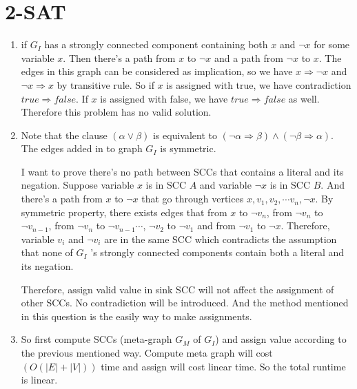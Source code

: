 \documentclass[11pt]{article}
\newenvironment{qparts}{\begin{enumerate}[{(}a{)}]}{\end{enumerate}}
\begin{document}
\section{2-SAT}
\begin{qparts}
	
	\item 

	if $G_I$ has a strongly connected component containing both $x$ and $\neg x$ for some variable $x$. Then there's a path from $x$ to $\neg x$ and a path from $\neg x$ to $x$. The edges in this graph can be considered as implication, so we have $x \Rightarrow  \neg x$ and $\neg x \Rightarrow  x$ by transitive rule.
	So if $x$ is assigned with true, we have contradiction $true\Rightarrow false$. If  $x$ is assigned with false, we have $true\Rightarrow false$ as well. Therefore this problem has no valid solution.
	
	\item
	
	Note that the clause $(\alpha \lor \beta)$ is equivalent to $(\neg \alpha  \Rightarrow \beta) \land (\neg \beta\Rightarrow  \alpha)$. The edges added in to graph $G_I$ is symmetric. 
	
	I want to prove there's no path between SCCs that contains a literal and its negation.
	Suppose variable $x$ is in SCC $A$ and variable $\neg x$ is in SCC $B$. And there's a path from $x$ to $\neg x$ that go through vertices $x, v_1, v_2, \cdots v_n, \neg x$.
	By symmetric property, there exists edges that from $x$ to $\neg v_{n}$, from $\neg v_n$ to $\neg v_{n-1}$, from $\neg v_n$ to $\neg v_{n-1} \cdots$, $\neg v_2$ to $\neg v_{1}$ and from $\neg v_1$ to $\neg x$. 
	Therefore, variable $v_i$ and $\neg v_i$ are in the same SCC which contradicts the assumption that none of $G_I$ ’s strongly connected components contain both a literal and its negation.
	
	Therefore, assign valid value in sink SCC will not affect the assignment of other SCCs. No contradiction will be introduced. And the method mentioned in this question is the easily way to make assignments.
	
	\item
	
	So first compute SCCs (meta-graph $G_M$ of $G_I$) and assign value according to the previous mentioned way. Compute meta graph will cost $(O(|E| + |V|))$ time and assign will cost linear time. So the total runtime is linear.
		
\end{qparts}
\end{document}
